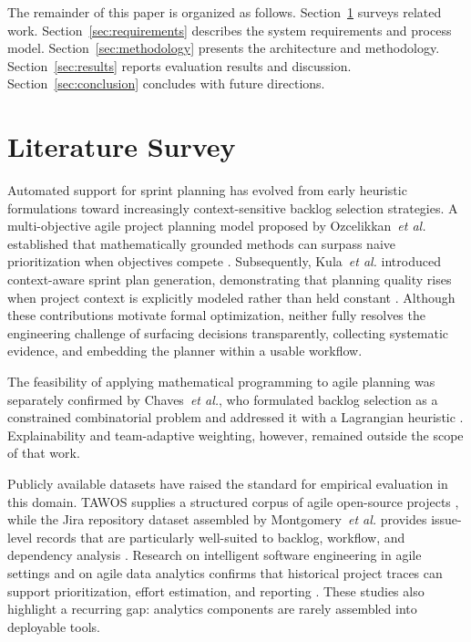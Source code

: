 \documentclass[conference]{IEEEtran}
\begin{document}
The remainder of this paper is organized as follows.
Section~\ref{sec:related} surveys related work.
Section~\ref{sec:requirements} describes the system requirements and process model.
Section~\ref{sec:methodology} presents the architecture and methodology.
Section~\ref{sec:results} reports evaluation results and discussion.
Section~\ref{sec:conclusion} concludes with future directions.

\section{Literature Survey}
\label{sec:related}

Automated support for sprint planning has evolved from early heuristic formulations
toward increasingly context-sensitive backlog selection strategies.
A multi-objective agile project planning model proposed by Ozcelikkan~\emph{et al.}
established that mathematically grounded methods can surpass naive prioritization
when objectives compete \cite{agile-mo}.
Subsequently, Kula~\emph{et al.} introduced context-aware sprint plan generation,
demonstrating that planning quality rises when project context is explicitly modeled
rather than held constant \cite{ase2024}.
Although these contributions motivate formal optimization, neither fully resolves the
engineering challenge of surfacing decisions transparently, collecting systematic
evidence, and embedding the planner within a usable workflow.

The feasibility of applying mathematical programming to agile planning was
separately confirmed by Chaves~\emph{et al.}, who formulated backlog selection
as a constrained combinatorial problem and addressed it with a Lagrangian heuristic
\cite{lagrangian-sprint}.
Explainability and team-adaptive weighting, however, remained outside the scope of
that work.

Publicly available datasets have raised the standard for empirical evaluation in
this domain.
TAWOS supplies a structured corpus of agile open-source projects \cite{tawos},
while the Jira repository dataset assembled by Montgomery~\emph{et al.} provides
issue-level records that are particularly well-suited to backlog, workflow, and
dependency analysis \cite{jira-dataset}.
Research on intelligent software engineering in agile settings and on agile data
analytics confirms that historical project traces can support prioritization,
effort estimation, and reporting \cite{intelligent-agile, bigdata-agile}.
These studies also highlight a recurring gap: analytics components are rarely
assembled into deployable tools.
\end{document}
